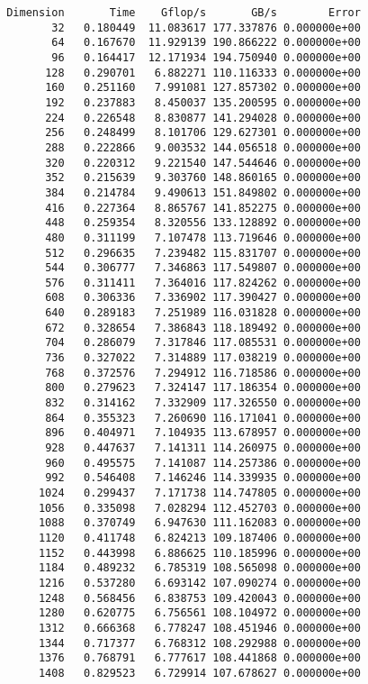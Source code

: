 \documentclass{article}
\begin{document}
\begin{enumerate}
    \begin{verbatim}
 Dimension       Time    Gflop/s       GB/s        Error
        32   0.180449  11.083617 177.337876 0.000000e+00
        64   0.167670  11.929139 190.866222 0.000000e+00
        96   0.164417  12.171934 194.750940 0.000000e+00
       128   0.290701   6.882271 110.116333 0.000000e+00
       160   0.251160   7.991081 127.857302 0.000000e+00
       192   0.237883   8.450037 135.200595 0.000000e+00
       224   0.226548   8.830877 141.294028 0.000000e+00
       256   0.248499   8.101706 129.627301 0.000000e+00
       288   0.222866   9.003532 144.056518 0.000000e+00
       320   0.220312   9.221540 147.544646 0.000000e+00
       352   0.215639   9.303760 148.860165 0.000000e+00
       384   0.214784   9.490613 151.849802 0.000000e+00
       416   0.227364   8.865767 141.852275 0.000000e+00
       448   0.259354   8.320556 133.128892 0.000000e+00
       480   0.311199   7.107478 113.719646 0.000000e+00
       512   0.296635   7.239482 115.831707 0.000000e+00
       544   0.306777   7.346863 117.549807 0.000000e+00
       576   0.311411   7.364016 117.824262 0.000000e+00
       608   0.306336   7.336902 117.390427 0.000000e+00
       640   0.289183   7.251989 116.031828 0.000000e+00
       672   0.328654   7.386843 118.189492 0.000000e+00
       704   0.286079   7.317846 117.085531 0.000000e+00
       736   0.327022   7.314889 117.038219 0.000000e+00
       768   0.372576   7.294912 116.718586 0.000000e+00
       800   0.279623   7.324147 117.186354 0.000000e+00
       832   0.314162   7.332909 117.326550 0.000000e+00
       864   0.355323   7.260690 116.171041 0.000000e+00
       896   0.404971   7.104935 113.678957 0.000000e+00
       928   0.447637   7.141311 114.260975 0.000000e+00
       960   0.495575   7.141087 114.257386 0.000000e+00
       992   0.546408   7.146246 114.339935 0.000000e+00
      1024   0.299437   7.171738 114.747805 0.000000e+00
      1056   0.335098   7.028294 112.452703 0.000000e+00
      1088   0.370749   6.947630 111.162083 0.000000e+00
      1120   0.411748   6.824213 109.187406 0.000000e+00
      1152   0.443998   6.886625 110.185996 0.000000e+00
      1184   0.489232   6.785319 108.565098 0.000000e+00
      1216   0.537280   6.693142 107.090274 0.000000e+00
      1248   0.568456   6.838753 109.420043 0.000000e+00
      1280   0.620775   6.756561 108.104972 0.000000e+00
      1312   0.666368   6.778247 108.451946 0.000000e+00
      1344   0.717377   6.768312 108.292988 0.000000e+00
      1376   0.768791   6.777617 108.441868 0.000000e+00
      1408   0.829523   6.729914 107.678627 0.000000e+00

\end{verbatim}
\end{enumerate}
\end{document}
